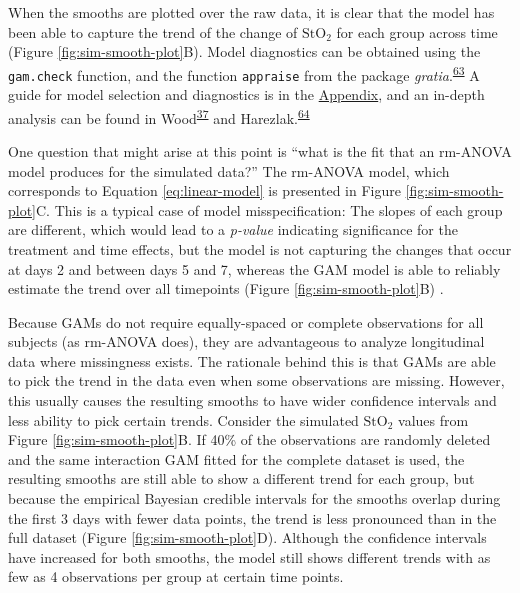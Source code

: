 \documentclass[
]{article}
\newcommand{\passthrough}[1]{#1}
\begin{document}
When the smooths are plotted over the raw data, it is clear that the model has been able to capture the trend of the change of \(\mbox{StO}_2\) for each group across time (Figure \ref{fig:sim-smooth-plot}B). Model diagnostics can be obtained using the \passthrough{\lstinline!gam.check!} function, and the function \passthrough{\lstinline!appraise!} from the package \emph{gratia}.\textsuperscript{\protect\hyperlink{ref-gratia}{63}} A guide for model selection and diagnostics is in the \protect\hyperlink{workflow}{Appendix}, and an in-depth analysis can be found in Wood\textsuperscript{\protect\hyperlink{ref-wood2017}{37}} and Harezlak.\textsuperscript{\protect\hyperlink{ref-harezlak2018}{64}}

One question that might arise at this point is ``what is the fit that an rm-ANOVA model produces for the simulated data?'' The rm-ANOVA model, which corresponds to Equation \eqref{eq:linear-model} is presented in Figure \ref{fig:sim-smooth-plot}C. This is a typical case of model misspecification: The slopes of each group are different, which would lead to a \emph{p-value} indicating significance for the treatment and time effects, but the model is not capturing the changes that occur at days 2 and between days 5 and 7, whereas the GAM model is able to reliably estimate the trend over all timepoints (Figure \ref{fig:sim-smooth-plot}B) .

Because GAMs do not require equally-spaced or complete observations for all subjects (as rm-ANOVA does), they are advantageous to analyze longitudinal data where missingness exists. The rationale behind this is that GAMs are able to pick the trend in the data even when some observations are missing. However, this usually causes the resulting smooths to have wider confidence intervals and less ability to pick certain trends. Consider the simulated \(\mbox{StO}_2\) values from Figure \ref{fig:sim-smooth-plot}B. If 40\% of the observations are randomly deleted and the same interaction GAM fitted for the complete dataset is used, the resulting smooths are still able to show a different trend for each group, but because the empirical Bayesian credible intervals for the smooths overlap during the first 3 days with fewer data points, the trend is less pronounced than in the full dataset (Figure \ref{fig:sim-smooth-plot}D). Although the confidence intervals have increased for both smooths, the model still shows different trends with as few as 4 observations per group at certain time points.
\end{document}
